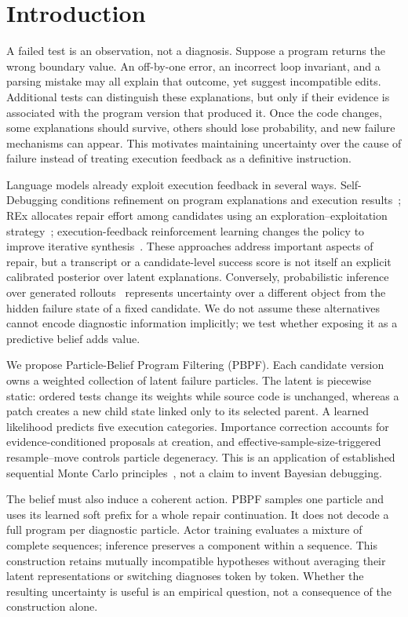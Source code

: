 \section{Introduction}
A failed test is an observation, not a diagnosis. Suppose a program returns the wrong boundary value. An off-by-one error, an incorrect loop invariant, and a parsing mistake may all explain that outcome, yet suggest incompatible edits. Additional tests can distinguish these explanations, but only if their evidence is associated with the program version that produced it. Once the code changes, some explanations should survive, others should lose probability, and new failure mechanisms can appear. This motivates maintaining uncertainty over the cause of failure instead of treating execution feedback as a definitive instruction.

Language models already exploit execution feedback in several ways. Self-Debugging conditions refinement on program explanations and execution results~\citep{selfdebug}; REx allocates repair effort among candidates using an exploration--exploitation strategy~\citep{rex}; execution-feedback reinforcement learning changes the policy to improve iterative synthesis~\citep{rlef}. These approaches address important aspects of repair, but a transcript or a candidate-level success score is not itself an explicit calibrated posterior over latent explanations. Conversely, probabilistic inference over generated rollouts~\citep{roulette} represents uncertainty over a different object from the hidden failure state of a fixed candidate. We do not assume these alternatives cannot encode diagnostic information implicitly; we test whether exposing it as a predictive belief adds value.

We propose Particle-Belief Program Filtering (PBPF). Each candidate version owns a weighted collection of latent failure particles. The latent is piecewise static: ordered tests change its weights while source code is unchanged, whereas a patch creates a new child state linked only to its selected parent. A learned likelihood predicts five execution categories. Importance correction accounts for evidence-conditioned proposals at creation, and effective-sample-size-triggered resample--move controls particle degeneracy. This is an application of established sequential Monte Carlo principles~\citep{delmoral2006,gilks2001}, not a claim to invent Bayesian debugging.

The belief must also induce a coherent action. PBPF samples one particle and uses its learned soft prefix for a whole repair continuation. It does not decode a full program per diagnostic particle. Actor training evaluates a mixture of complete sequences; inference preserves a component within a sequence. This construction retains mutually incompatible hypotheses without averaging their latent representations or switching diagnoses token by token. Whether the resulting uncertainty is useful is an empirical question, not a consequence of the construction alone.

